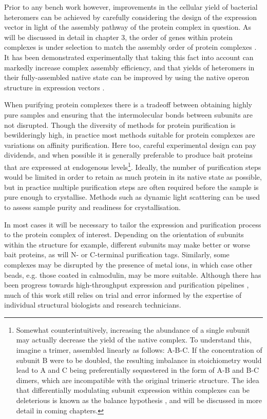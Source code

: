 \documentclass[a4paper,11pt,twoside,openright]{scrbook}
\begin{document}
Prior to any bench work however, improvements in the cellular yield of bacterial heteromers can be achieved by carefully considering the design of the expression vector in light of the assembly pathway of the protein complex in question. As will be discussed in detail in chapter 3, the order of genes within protein complexes is under selection to match the assembly order of protein complexes \cite{Wells2016}. It has been demonstrated experimentally that taking this fact into account can markedly increase complex assembly efficiency, and that yields of heteromers in their fully-assembled native state can be improved by using the native operon structure in expression vectors \cite{Shieh2015a, Poulsen2010}.

When purifying protein complexes there is a tradeoff between obtaining highly pure samples and ensuring that the intermolecular bonds between subunits are not disrupted. Though the diversity of methods for protein purification is bewilderingly high, in practice most methods suitable for protein complexes are variations on affinity purification. Here too, careful experimental design can pay dividends, and when possible it is generally preferable to produce bait proteins that are expressed at endogenous levels\footnote{Somewhat counterintuitively, increasing the abundance of a single subunit may actually decrease the yield of the native complex. To understand this, imagine a trimer, assembled linearly as follows: A-B-C. If the concentration of subunit B were to be doubled, the resulting imbalance in stoichiometry would lead to A and C being preferentially sequestered in the form of A-B and B-C dimers, which are incompatible with the original trimeric structure. The idea that differentially modulating subunit expression within complexes can be deleterious is known as the balance hypothesis \cite{Papp2003}, and will be discussed in more detail in coming chapters.}. Ideally, the number of purification steps would be limited in order to retain as much protein in its native state as possible, but in practice multiple purification steps are often required before the sample is pure enough to crystallise. Methods such as dynamic light scattering \cite{Ni2013} can be used to assess sample purity and readiness for crystallisation.

In most cases it will be necessary to tailor the expression and purification process to the protein complex of interest. Depending on the orientation of subunits within the structure for example, different subunits may make better or worse bait proteins, as will N- or C-terminal purification tags. Similarly, some complexes may be disrupted by the presence of metal ions, in which case other beads, e.g. those coated in calmodulin, may be more suitable. Although there has been progress towards high-throughput expression and purification pipelines \cite{Jia2016}, much of this work still relies on trial and error informed by the expertise of individual structural biologists and research technicians.
\end{document}
